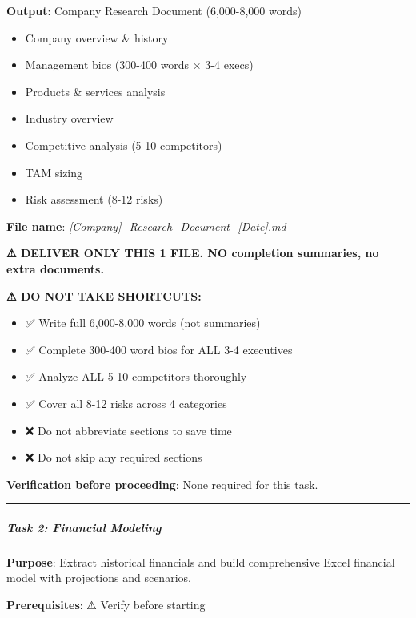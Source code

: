 \documentclass[11pt]{article}
\begin{document}
\textbf{Output}: Company Research Document (6,000-8,000 words)

\begin{itemize}[leftmargin=*,itemsep=2pt,topsep=2pt]
\item {} Company overview \& history
\item {} Management bios (300-400 words × 3-4 execs)
\item {} Products \& services analysis
\item {} Industry overview
\item {} Competitive analysis (5-10 competitors)
\item {} TAM sizing
\item {} Risk assessment (8-12 risks)
\end{itemize}

\textbf{File name}: \emph{[Company]\_\allowbreak{}Research\_\allowbreak{}Document\_\allowbreak{}[Date].md}


\textbf{⚠ DELIVER ONLY THIS 1 FILE. NO completion summaries, no extra documents.}


\textbf{⚠ DO NOT TAKE SHORTCUTS:}

\begin{itemize}[leftmargin=*,itemsep=2pt,topsep=2pt]
\item {} ✅ Write full 6,000-8,000 words (not summaries)
\item {} ✅ Complete 300-400 word bios for ALL 3-4 executives
\item {} ✅ Analyze ALL 5-10 competitors thoroughly
\item {} ✅ Cover all 8-12 risks across 4 categories
\item {} ❌ Do not abbreviate sections to save time
\item {} ❌ Do not skip any required sections
\end{itemize}

\textbf{Verification before proceeding}: None required for this task.


\vspace{0.5em}\hrule\vspace{0.5em}

\subparagraph{Task 2: Financial Modeling}\mbox{}\par

\textbf{Purpose}: Extract historical financials and build comprehensive Excel financial model with projections and scenarios.


\textbf{Prerequisites}: ⚠ Verify before starting
\end{document}
